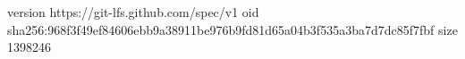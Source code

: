 version https://git-lfs.github.com/spec/v1
oid sha256:968f3f49ef84606ebb9a38911be976b9fd81d65a04b3f535a3ba7d7dc85f7fbf
size 1398246
